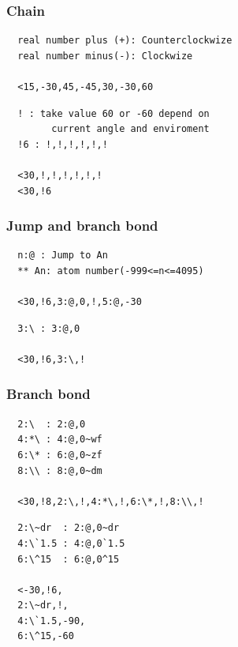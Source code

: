 \documentclass[a4paper]{article}
\makeatletter
\def\MCFstructure{\hspace{5mm}{\@strufont\char\fontnum}\advance\fontnum\@ne\relax}%
\makeatother
\begin{document}
\subsubsection{Chain}
\begin{verbatim}
  real number plus (+): Counterclockwize 
  real number minus(-): Clockwize

  <15,-30,45,-45,30,-30,60
\end{verbatim}
\MCFstructure
\begin{verbatim}
  ! : take value 60 or -60 depend on
        current angle and enviroment
  !6 : !,!,!,!,!,!

  <30,!,!,!,!,!,!
  <30,!6
\end{verbatim}
\MCFstructure
\subsubsection{Jump and branch bond}
\begin{verbatim}
  n:@ : Jump to An
  ** An: atom number(-999<=n<=4095)
       
  <30,!6,3:@,0,!,5:@,-30
\end{verbatim}
\MCFstructure
\begin{verbatim}
  3:\ : 3:@,0

  <30,!6,3:\,!
\end{verbatim}
\MCFstructure
\subsubsection{Branch bond}
\begin{verbatim}
  2:\  : 2:@,0
  4:*\ : 4:@,0~wf
  6:\* : 6:@,0~zf
  8:\\ : 8:@,0~dm

  <30,!8,2:\,!,4:*\,!,6:\*,!,8:\\,!
\end{verbatim}
\MCFstructure
\begin{verbatim}
  2:\~dr  : 2:@,0~dr
  4:\`1.5 : 4:@,0`1.5
  6:\^15  : 6:@,0^15

  <-30,!6,
  2:\~dr,!,
  4:\`1.5,-90,
  6:\^15,-60
\end{verbatim}
\MCFstructure
\end{document}
